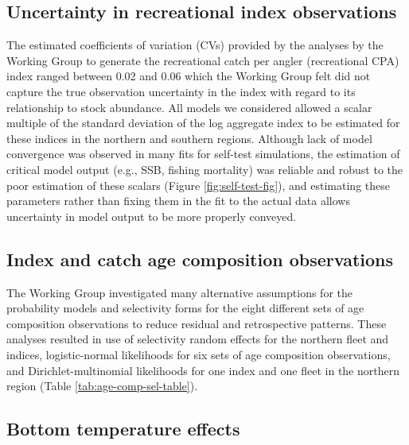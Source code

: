 \documentclass[
]{article}
\begin{document}
\hypertarget{uncertainty-in-recreational-index-observations}{%
\subsection*{Uncertainty in recreational index observations}\label{uncertainty-in-recreational-index-observations}}

The estimated coefficients of variation (CVs) provided by the analyses by the Working Group to generate the recreational catch per angler (recreational CPA) index ranged between 0.02 and 0.06 which the Working Group felt did not capture the true observation uncertainty in the index with regard to its relationship to stock abundance. All models we considered allowed a scalar multiple of the standard deviation of the log aggregate index to be estimated for these indices in the northern and southern regions. Although lack of model convergence was observed in many fits for self-test simulations, the estimation of critical model output (e.g., SSB, fishing mortality) was reliable and robust to the poor estimation of these scalars (Figure \ref{fig:self-test-fig}), and estimating these parameters rather than fixing them in the fit to the actual data allows uncertainty in model output to be more properly conveyed.

\hypertarget{index-and-catch-age-composition-observations}{%
\subsection*{Index and catch age composition observations}\label{index-and-catch-age-composition-observations}}

The Working Group investigated many alternative assumptions for the probability models and selectivity forms for the eight different sets of age composition observations to reduce residual and retrospective patterns. These analyses resulted in use of selectivity random effects for the northern fleet and indices, logistic-normal likelihoods for six sets of age composition observations, and Dirichlet-multinomial likelihoods for one index and one fleet in the northern region (Table \ref{tab:age-comp-sel-table}).

\hypertarget{bottom-temperature-effects}{%
\subsection*{Bottom temperature effects}\label{bottom-temperature-effects}}
\end{document}
